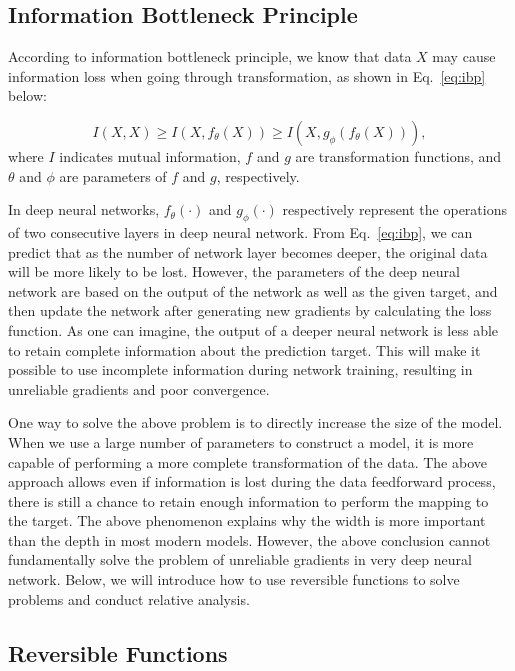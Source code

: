 \documentclass[10pt,twocolumn,letterpaper]{article}
\begin{document}
	\newpage
	
	\subsection{Information Bottleneck Principle}
	
	According to information bottleneck principle, we know that data $X$ may cause information loss when going through transformation, as shown in Eq.~\ref{eq:ibp} below:
	
	\begin{equation}
		I(X,X) \geq I(X, f_{\theta}(X)) \geq I(X, g_{\phi}(f_{\theta}(X))),
		\label{eq:ibp}
	\end{equation}
	where $I$ indicates mutual information, $f$ and $g$ are transformation functions, and $\theta$ and $\phi$ are parameters of $f$ and $g$, respectively.
	
	In deep neural networks, $f_{\theta}(\cdot)$ and $g_{\phi}(\cdot)$ respectively represent the operations of two consecutive layers in deep neural network.  From Eq.~\ref{eq:ibp}, we can predict that as the number of network layer becomes deeper, the original data will be more likely to be lost.  However, the parameters of the deep neural network are based on the output of the network as well as the given target, and then update the network after generating new gradients by calculating the loss function.  As one can imagine, the output of a deeper neural network is less able to retain complete information about the prediction target.  This will make it possible to use incomplete information during network training, resulting in unreliable gradients and poor convergence.
	
	One way to solve the above problem is to directly increase the size of the model.  When we use a large number of parameters to construct a model, it is more capable of performing a more complete transformation of the data.  The above approach allows even if information is lost during the data feedforward process, there is still a chance to retain enough information to perform the mapping to the target.  The above phenomenon explains why the width is more important than the depth in most modern models.  However, the above conclusion cannot fundamentally solve the problem of unreliable gradients in very deep neural network.  Below, we will introduce how to use reversible functions to solve problems and conduct relative analysis.
	
	\subsection{Reversible Functions}
	
\end{document}
